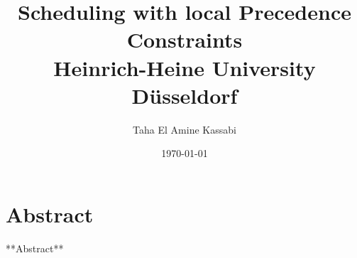 \documentclass{report}
\title{
    Scheduling with local Precedence Constraints\\
    {\Large Heinrich-Heine University Düsseldorf}
}
\author{Taha El Amine Kassabi}
\date{\today}
\begin{document}
    \maketitle

    \chapter*{Abstract}
    **Abstract**

    \tableofcontents

    
    
    
    
    

    \appendix
    
    
\end{document}
